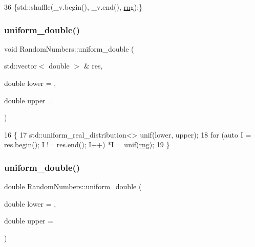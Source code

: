 \begin{DoxyCode}
36 \{std::shuffle(\_v.begin(), \_v.end(), \mbox{\hyperlink{classRandomNumbers_a15ceee85d6d00de12ae76c90aaec2f14}{rng}});\}
\end{DoxyCode}
\mbox{\label{classRandomNumbers_ae226c129494f9055ac37ed1af943d010}} 
\subsubsection{\texorpdfstring{uniform\+\_\+double()}{uniform\_double()}\hspace{0.1cm}{\footnotesize\ttfamily [1/2]}}
{\footnotesize\ttfamily void Random\+Numbers\+::uniform\+\_\+double (\begin{DoxyParamCaption}\item[{std\+::vector$<$ double $>$ \&}]{res,  }\item[{double}]{lower = {},  }\item[{double}]{upper = {} }\end{DoxyParamCaption})}


\begin{DoxyCode}
16                                                                                      \{
17     std::uniform\_real\_distribution<> unif(lower, upper);
18     \textcolor{keywordflow}{for} (\textcolor{keyword}{auto} I = res.begin(); I != res.end(); I++) *I = unif(\mbox{\hyperlink{classRandomNumbers_a15ceee85d6d00de12ae76c90aaec2f14}{rng}});
19 \}
\end{DoxyCode}
\mbox{\label{classRandomNumbers_a1e66bf9926ad3916f3804dd20ea393f1}} 
\subsubsection{\texorpdfstring{uniform\+\_\+double()}{uniform\_double()}\hspace{0.1cm}{\footnotesize\ttfamily [2/2]}}
{\footnotesize\ttfamily double Random\+Numbers\+::uniform\+\_\+double (\begin{DoxyParamCaption}\item[{double}]{lower = {},  }\item[{double}]{upper = {} }\end{DoxyParamCaption})}


